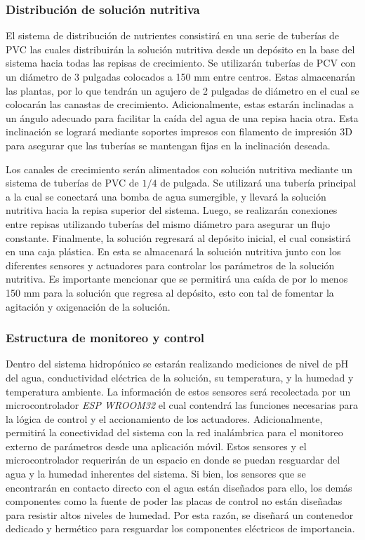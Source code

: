 \subsubsection{Distribución de solución nutritiva}
El sistema de distribución de nutrientes consistirá en una serie de tuberías de PVC las cuales distribuirán la solución nutritiva desde un depósito en la base del sistema hacia todas las repisas de crecimiento. Se utilizarán tuberías de PCV con un diámetro de 3 pulgadas colocados a 150 mm entre centros. Estas almacenarán las plantas, por lo que tendrán un agujero de 2 pulgadas de diámetro en el cual se colocarán las canastas de crecimiento. Adicionalmente, estas estarán inclinadas a un ángulo adecuado para facilitar la caída del agua de una repisa hacia otra. Esta inclinación se logrará mediante soportes impresos con filamento de impresión 3D para asegurar que las tuberías se mantengan fijas en la inclinación deseada. 

Los canales de crecimiento serán alimentados con solución nutritiva mediante un sistema de tuberías de PVC de $1/4$ de pulgada. Se utilizará una tubería principal a la cual se conectará una bomba de agua sumergible, y llevará la solución nutritiva hacia la repisa superior del sistema. Luego, se realizarán conexiones entre repisas utilizando tuberías del mismo diámetro para asegurar un flujo constante. Finalmente, la solución regresará al depósito inicial, el cual consistirá en una caja plástica. En esta se almacenará la solución nutritiva junto con los diferentes sensores y actuadores para controlar los parámetros de la solución nutritiva. Es importante mencionar que se permitirá una caída de por lo menos 150 mm para la solución que regresa al depósito, esto con tal de fomentar la agitación y oxigenación de la solución.

\subsubsection{Estructura de monitoreo y control}
Dentro del sistema hidropónico se estarán realizando mediciones de nivel de pH del agua, conductividad eléctrica de la solución, su temperatura, y la humedad y temperatura ambiente. La información de estos sensores será recolectada por un microcontrolador \textit{ESP WROOM32} el cual contendrá las funciones necesarias para la lógica de control y el accionamiento de los actuadores. Adicionalmente, permitirá la conectividad del sistema con la red inalámbrica para el monitoreo externo de parámetros desde una aplicación móvil. Estos sensores y el microcontrolador requerirán de un espacio en donde se puedan resguardar del agua y la humedad inherentes del sistema. Si bien, los sensores que se encontrarán en contacto directo con el agua están diseñados para ello, los demás componentes como la fuente de poder las placas de control no están diseñadas para resistir altos niveles de humedad. Por esta razón, se diseñará un contenedor dedicado y hermético para resguardar los componentes eléctricos de importancia.

